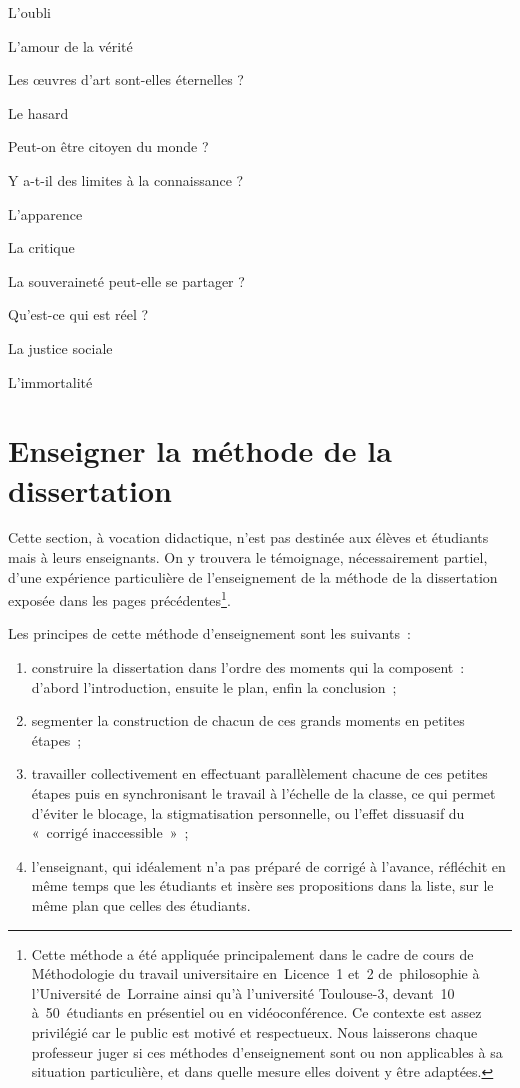 \documentclass[a4paper,12pt]{article}
\begin{document}
\begin{multicols}{2}
\noindent L’oubli \par
\noindent L’amour de la vérité \par
\noindent Les œuvres d’art sont-elles éternelles ? \par
\noindent Le hasard \par
\noindent Peut-on être citoyen du monde ? \par
\noindent Y a-t-il des limites à la connaissance ? \par
\noindent L’apparence \par
\noindent La critique \par
\noindent La souveraineté peut-elle se partager ? \par
\noindent Qu’est-ce qui est réel ? \par
\noindent La justice sociale \par
\noindent L’immortalité \par
\end{multicols}


\section{Enseigner la méthode de la dissertation}
\label{sec:org15516d1}
Cette section, à vocation didactique, n'est pas destinée aux élèves et
étudiants mais à leurs enseignants. On y trouvera le témoignage,
nécessairement partiel, d'une expérience particulière de l'enseignement
de la méthode de la dissertation exposée dans les pages
précédentes\footnote{Cette méthode a été appliquée principalement dans le cadre de
cours de Méthodologie du travail universitaire en Licence 1 et 2
de philosophie à l'Université de Lorraine ainsi qu'à l'université
Toulouse-3, devant 10 à 50 étudiants en présentiel ou en
vidéoconférence. Ce contexte est assez privilégié car le public est
motivé et respectueux. Nous laisserons chaque professeur juger si ces
méthodes d'enseignement sont ou non applicables à sa situation
particulière, et dans quelle mesure elles doivent y être adaptées.}.

Les principes de cette méthode d'enseignement sont les suivants : 
\begin{enumerate}
\item construire la dissertation dans l'ordre des moments qui la
composent : d'abord l'introduction, ensuite le plan, enfin la
conclusion ;
\item segmenter la construction de chacun de ces grands moments en petites
étapes ;
\item travailler collectivement en effectuant parallèlement chacune de ces
petites étapes puis en synchronisant le travail à l'échelle de la
classe, ce qui permet d'éviter le blocage, la stigmatisation
personnelle, ou l'effet dissuasif du « corrigé inaccessible » ;
\item l'enseignant, qui idéalement n'a pas préparé de corrigé à l'avance,
réfléchit en même temps que les étudiants et insère ses propositions
dans la liste, sur le même plan que celles des étudiants.
\end{enumerate}
\end{document}
